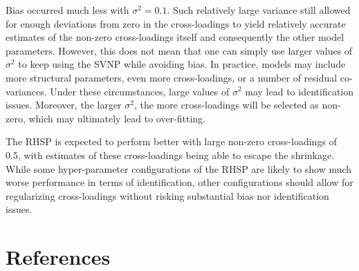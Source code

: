 \documentclass[
  man,floatsintext]{apa6}
\begin{document}
Bias occurred much less with \(\sigma^2 = 0.1\). Such relatively large variance still allowed for enough deviations from zero in the cross-loadings to yield relatively accurate estimates of the non-zero cross-loadings itself and consequently the other model parameters. However, this does not mean that one can simply use larger values of \(\sigma^2\) to keep using the SVNP while avoiding bias. In practice, models may include more structural parameters, even more cross-loadings, or a number of residual co-variances. Under these circumstances, large values of \(\sigma^2\) may lead to identification issues. Moreover, the larger \(\sigma^2\), the more cross-loadings will be selected as non-zero, which may ultimately lead to over-fitting.

The RHSP is expected to perform better with large non-zero cross-loadings of 0.5, with estimates of these cross-loadings being able to escape the shrinkage. While some hyper-parameter configurations of the RHSP are likely to show much worse performance in terms of identification, other configurations should allow for regularizing cross-loadings without risking substantial bias nor identification issues.

\clearpage

\hypertarget{references}{%
\section{References}\label{references}}

~

\begingroup
\setlength{\parindent}{-0.5in}
\setlength{\leftskip}{0.5in}
\end{document}
